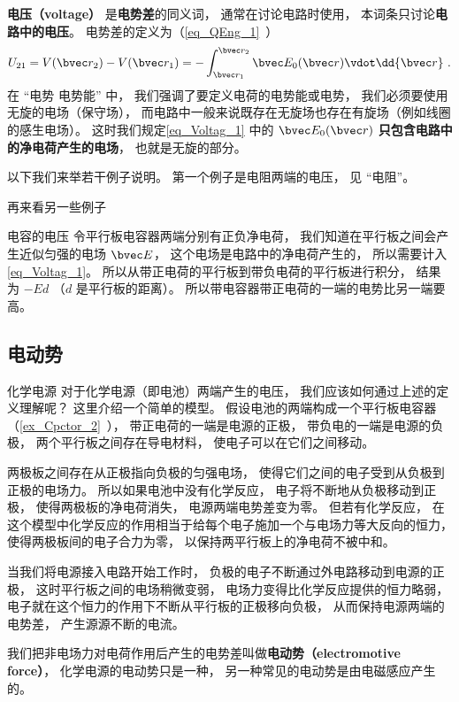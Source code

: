 

\textbf{电压（voltage）} 是\textbf{电势差}的同义词， 通常在讨论电路时使用， 本词条只讨论\textbf{电路中的电压}。 电势差的定义为（\autoref{eq_QEng_1}~）
\begin{equation}\label{eq_Voltag_1}
U_{21} = V(\bvec r_2) - V(\bvec r_1) = - \int_{\bvec r_1}^{\bvec r_2} \bvec E_0(\bvec r) \vdot \dd{\bvec r}~.
\end{equation}
在 “电势 电势能” 中， 我们强调了要定义电荷的电势能或电势， 我们必须要使用无旋的电场（保守场）， 而电路中一般来说既存在无旋场也存在有旋场（例如线圈的感生电场）。 这时我们规定\autoref{eq_Voltag_1} 中的 $\bvec E_0(\bvec r)$ \textbf{只包含电路中的净电荷产生的电场}， 也就是无旋的部分。

以下我们来举若干例子说明。 第一个例子是电阻两端的电压， 见 “电阻”。

再来看另一些例子
\begin{example}{电容的电压}
令平行板电容器两端分别有正负净电荷， 我们知道在平行板之间会产生近似匀强的电场 $\bvec E$， 这个电场是电路中的净电荷产生的， 所以需要计入\autoref{eq_Voltag_1}。 所以从带正电荷的平行板到带负电荷的平行板进行积分， 结果为 $-E d$ （$d$ 是平行板的距离）。 所以带电容器带正电荷的一端的电势比另一端要高。
\end{example}

\subsection{电动势}
\begin{example}{化学电源}
对于化学电源（即电池）两端产生的电压， 我们应该如何通过上述的定义理解呢？ 这里介绍一个简单的模型。 假设电池的两端构成一个平行板电容器（\autoref{ex_Cpctor_2}~）， 带正电荷的一端是电源的正极， 带负电的一端是电源的负极， 两个平行板之间存在导电材料， 使电子可以在它们之间移动。

两极板之间存在从正极指向负极的匀强电场， 使得它们之间的电子受到从负极到正极的电场力。 所以如果电池中没有化学反应， 电子将不断地从负极移动到正极， 使得两极板的净电荷消失， 电源两端电势差变为零。 但若有化学反应， 在这个模型中化学反应的作用相当于给每个电子施加一个与电场力等大反向的恒力， 使得两极板间的电子合力为零， 以保持两平行板上的净电荷不被中和。

当我们将电源接入电路开始工作时， 负极的电子不断通过外电路移动到电源的正极， 这时平行板之间的电场稍微变弱， 电场力变得比化学反应提供的恒力略弱， 电子就在这个恒力的作用下不断从平行板的正极移向负极， 从而保持电源两端的电势差， 产生源源不断的电流。
\end{example}
我们把非电场力对电荷作用后产生的电势差叫做\textbf{电动势（electromotive force）}， 化学电源的电动势只是一种， 另一种常见的电动势是由电磁感应产生的。

